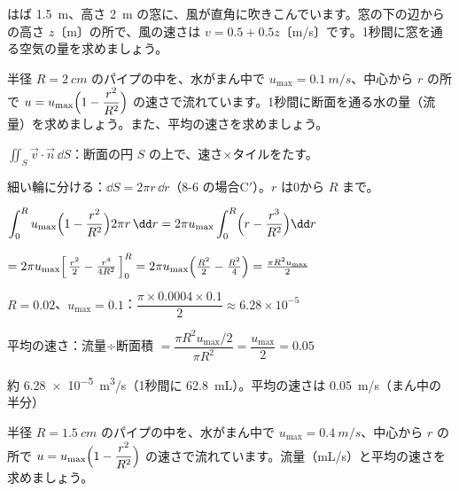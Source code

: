 \begin{jibun}
はば \qty{1.5}{m}、高さ \qty{2}{m} の窓に、風が直角に吹きこんでいます。窓の下の辺からの高さ $z$〔m〕の所で、風の速さは $v=0.5+0.5z$〔m/s〕です。1秒間に窓を通る空気の量を求めましょう。
\end{jibun}

\begin{reidai}[パイプの断面を通る水]
半径 $R=\qty{2}{cm}$ のパイプの中を、水がまん中で $u_{\max}=\qty{0.1}{m/s}$、中心から $r$ の所で $u=u_{\max}\Bigl(1-\dfrac{r^2}{R^2}\Bigr)$ の速さで流れています。1秒間に断面を通る水の量（流量）を求めましょう。また、平均の速さを求めましょう。\par
\kangaekata {}\par
{}\enspace $\displaystyle\iint_S\vec v\cdot\vec n\,\dd S$：断面の円 $S$ の上で、速さ×タイルをたす。\par
{}\enspace 細い輪に分ける：$\dd S=2\pi r\,\dd r$（8-6 の場合C$'$）。$r$ は0から $R$ まで。\par
\shiki\kviiiis{}\zw{} $\displaystyle\int_0^R u_{\max}\Bigl(1-\frac{r^2}{R^2}\Bigr)2\pi r\,\dd r=2\pi u_{\max}\int_0^R\Bigl(r-\frac{r^3}{R^2}\Bigr)\dd r$\par
\kviiiib $=2\pi u_{\max}\Bigl[\,\frac{r^2}{2}-\frac{r^4}{4R^2}\,\Bigr]_0^R=2\pi u_{\max}\Bigl(\frac{R^2}{2}-\frac{R^2}{4}\Bigr)=\frac{\pi R^2u_{\max}}{2}$\par
\kviiiia $R=0.02$、$u_{\max}=0.1$：$\dfrac{\pi\times0.0004\times0.1}{2}\approx6.28\times10^{-5}$\par
\kviiiia 平均の速さ：流量÷断面積 $=\dfrac{\pi R^2u_{\max}/2}{\pi R^2}=\dfrac{u_{\max}}{2}=0.05$\par
\kotae\kviiiis{}\zw{} 約 \qty{6.28e-5}{m^3/s}（1秒間に \qty{62.8}{mL}）。平均の速さは \qty{0.05}{m/s}（まん中の半分）
\end{reidai}

\begin{jibun}
半径 $R=\qty{1.5}{cm}$ のパイプの中を、水がまん中で $u_{\max}=\qty{0.4}{m/s}$、中心から $r$ の所で $u=u_{\max}\Bigl(1-\dfrac{r^2}{R^2}\Bigr)$ の速さで流れています。流量（mL/s）と平均の速さを求めましょう。
\end{jibun}

